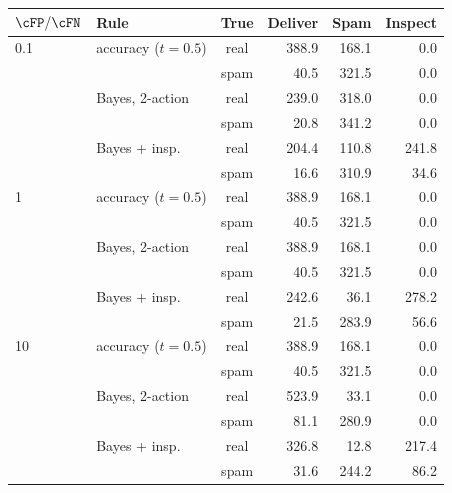 \begin{tabular}{llcrrr}
\toprule
$\cFP/\cFN$ & Rule & True & Deliver & Spam & Inspect \\
\midrule
0.1 & accuracy ($t=0.5$) & real & 388.9 & 168.1 & 0.0 \\
 &  & spam & 40.5 & 321.5 & 0.0 \\
 & Bayes, 2-action & real & 239.0 & 318.0 & 0.0 \\
 &  & spam & 20.8 & 341.2 & 0.0 \\
 & Bayes + insp. & real & 204.4 & 110.8 & 241.8 \\
 &  & spam & 16.6 & 310.9 & 34.6 \\
\midrule
1 & accuracy ($t=0.5$) & real & 388.9 & 168.1 & 0.0 \\
 &  & spam & 40.5 & 321.5 & 0.0 \\
 & Bayes, 2-action & real & 388.9 & 168.1 & 0.0 \\
 &  & spam & 40.5 & 321.5 & 0.0 \\
 & Bayes + insp. & real & 242.6 & 36.1 & 278.2 \\
 &  & spam & 21.5 & 283.9 & 56.6 \\
\midrule
10 & accuracy ($t=0.5$) & real & 388.9 & 168.1 & 0.0 \\
 &  & spam & 40.5 & 321.5 & 0.0 \\
 & Bayes, 2-action & real & 523.9 & 33.1 & 0.0 \\
 &  & spam & 81.1 & 280.9 & 0.0 \\
 & Bayes + insp. & real & 326.8 & 12.8 & 217.4 \\
 &  & spam & 31.6 & 244.2 & 86.2 \\
\bottomrule
\end{tabular}
